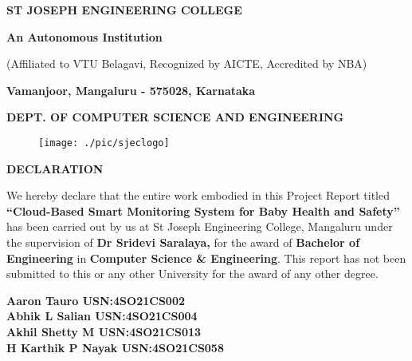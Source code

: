 \documentclass[12pt,a4paper]{report}
\begin{document}
\centering
\LARGE \textbf{ST JOSEPH ENGINEERING COLLEGE}
\par
\Large \textbf{An Autonomous Institution}
\par \large{(Affiliated to VTU Belagavi, Recognized by AICTE, Accredited by NBA)}
\par \vspace{3pt}
\large \textbf{Vamanjoor, Mangaluru - 575028, Karnataka}
\par \vspace{12pt}  
\par
\large \textbf{DEPT. OF COMPUTER SCIENCE AND ENGINEERING}
\par
\begin{figure}[hbtp]
\centering
\texttt{[image: ./pic/sjeclogo]}
\end{figure}

\begin{center}
{\Large \textbf{DECLARATION}}
\end{center}
\justifying
\par
{}
\noindent We hereby declare that the entire work embodied in this Project Report titled
\textbf{``Cloud-Based Smart Monitoring System for Baby Health
and Safety''} has been carried out by us at St Joseph Engineering College, Mangaluru under the supervision of \textbf{Dr Sridevi Saralaya,} for the award of \textbf{Bachelor of Engineering} in \textbf{Computer Science \& Engineering}. This report has not been submitted to this or any other University  for the award of any  other degree. \\
\vspace{0.25in}

\begin{flushleft}
\textbf{Aaron Tauro  USN:4SO21CS002}\\
\vspace{0.1in}
\textbf{Abhik L Salian  USN:4SO21CS004}\\
\vspace{0.1in}
\textbf{Akhil Shetty M  USN:4SO21CS013}\\
\vspace{0.1in}
\textbf{H Karthik P Nayak  USN:4SO21CS058}\\
\end{flushleft}

{}
\end{document}
